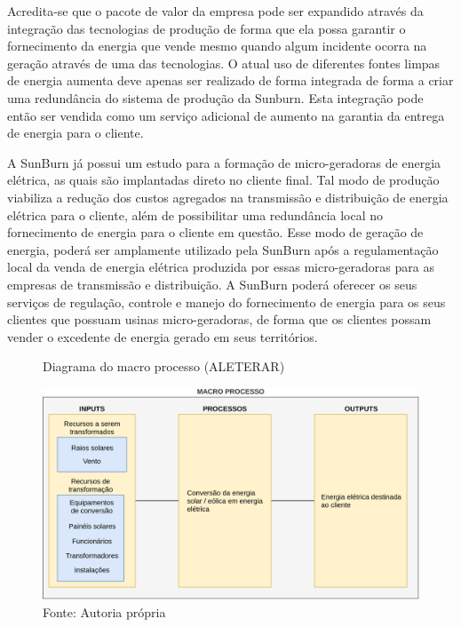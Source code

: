 Acredita-se que o pacote de valor da empresa pode ser expandido através da integração das tecnologias de produção de forma que ela possa garantir o fornecimento da energia que vende mesmo quando algum incidente ocorra na geração através de uma das tecnologias. O atual uso de diferentes fontes limpas de energia aumenta deve apenas ser realizado de forma integrada de forma a criar uma redundância do sistema de produção da Sunburn. Esta integração pode então ser vendida como um serviço adicional de aumento na garantia da entrega de energia para o cliente.

A SunBurn já possui um estudo para a formação de micro-geradoras de energia elétrica, as quais são implantadas direto no cliente final. Tal modo de produção viabiliza a redução dos custos agregados na transmissão e distribuição de energia elétrica para o cliente, além de possibilitar uma redundância local no fornecimento de energia para o cliente em questão. Esse modo de geração de energia, poderá ser amplamente utilizado pela SunBurn após a regulamentação local da venda de energia elétrica produzida por essas micro-geradoras para as empresas de transmissão e distribuição. A SunBurn poderá oferecer os seus serviços de regulação, controle e manejo do fornecimento de energia para os seus clientes que possuam usinas micro-geradoras, de forma que os clientes possam vender o excedente de energia gerado em seus territórios.

\begin{figure}[H]
    \caption{Diagrama do macro processo (ALETERAR)}
    \includegraphics[width = 1.1\textwidth]{images/diagram.png}
    \caption*{Fonte: Autoria própria}
    \label{fig:gestao_operacoes_aplicacao_diagrama}
\end{figure}


